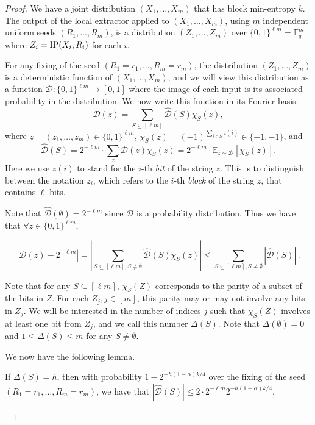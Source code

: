 \documentclass{toc}
\def\E{\mathbb{E}}
\newcommand{\IP}{\textnormal{IP}}
\newcommand{\F}{\mathbb{F}}
\newcommand{\calD}{\mathcal{D}} %
\begin{document}
\begin{proof}
We have a joint distribution $(X_1, \ldots, X_m)$ that has
block min-entropy $k$. The output of the local extractor applied to $(X_1, \ldots, X_m)$, using $m$ independent uniform seeds $(R_1, \ldots, R_m)$,
is a distribution $(Z_1, \ldots, Z_m)$ over $\{0, 1\}^{\ell m}=\F_q^m$ where $Z_i=\IP(X_i, R_i)$ for each $i$.

For any fixing of the seed $(R_1=r_1, \ldots, R_m=r_m)$, the distribution $(Z_1, \ldots, Z_m)$ is a deterministic function of $(X_1, \ldots, X_m)$,
and we will view this distribution as a function ${\calD}: \{0, 1\}^{\ell m} \to [0, 1]$ where the image of each input is its associated probability
in the distribution. We now write this function in its Fourier basis:
\[{\calD}(z)=\sum_{S \subseteq [\ell m]} \hat{{\calD}}(S) \chi_S(z),\]
where $z=(z_1, \ldots, z_m) \in \{0, 1\}^{\ell m}$, $\chi_S(z)=(-1)^{\sum_{i \in S} z(i)} \in \{+1, -1\}$, and
\[ \hat{{\calD}}(S)=2^{-\ell m}\cdot \sum_z {\calD}(z) \chi_S(z)=2^{-\ell m} \cdot\E_{z \sim {\calD}} [\chi_S(z)]. \]
Here we use $z(i)$ to stand for the $i$-th \emph{bit} of the string $z$. This is to distinguish between the notation $z_i$, which
refers 
%
to the $i$-th \emph{block} of the string $z$, that contains $\ell$ bits.

Note that $\hat{{\calD}}(\emptyset)=2^{-\ell m}$ since ${\calD}$ is a probability distribution. Thus we have that $\forall z \in \{0, 1\}^{\ell m}$,

\begin{equation}
\left |{\calD}(z)-2^{-\ell m} \right | =\left |\sum_{S \subseteq [\ell m], S \neq \emptyset} \hat{{\calD}}(S) \chi_S(z) \right | \leq \sum_{S
\subseteq [\ell m], S \neq \emptyset} \left |\hat{{\calD}}(S) \right |\,.
\end{equation}
  
Note that for any $S \subseteq [\ell m]$, $\chi_S(Z)$ corresponds to the parity of a subset of the bits in $Z$. For each $Z_j, j \in [m]$, this
parity may or may not involve any bits in $Z_j$. We will be interested in the number of %
indices $j$  %
such that $\chi_S(Z)$ involves at least one bit from
$Z_j$, and we call this number $\Delta(S)$. Note that $\Delta(\emptyset)=0$ and $1 \leq \Delta(S) \leq m$ for any $S \neq \emptyset$.

We now have the following lemma.

\begin{lemma}
If $\Delta(S)=h$, then with probability 
%
$1-2^{-h(1-\alpha)k/4}$   %
over the fixing of the seed $(R_1=r_1, \ldots, R_m=r_m)$, we
have that 
%
$|\hat{\calD}(S) | \leq 2 \cdot 2^{-\ell m}2^{-h(1-\alpha)k/4}$.
\end{lemma}


\end{proof}
\end{document}
